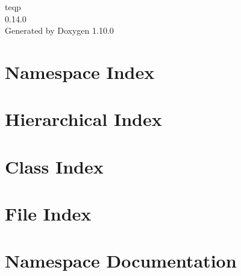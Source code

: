 \documentclass[twoside]{book}
\newcommand{\+}{\discretionary{\mbox{\scriptsize$\hookleftarrow$}}{}{}}
\newcommand{\clearemptydoublepage}{%
    \newpage{\pagestyle{empty}\cleardoublepage}%
  }
\begin{document}
  \raggedbottom
    \hypersetup{pageanchor=false,
                bookmarksnumbered=true,
                pdfencoding=unicode
               }
  \begin{titlepage}
  \vspace*{7cm}
  \begin{center}%
  {\Large teqp}\\
  [1ex]\large 0.\+14.\+0 \\
  \vspace*{1cm}
  {\large Generated by Doxygen 1.10.0}\\
  \end{center}
  \end{titlepage}
  \clearemptydoublepage
  \tableofcontents
  \clearemptydoublepage
  \hypersetup{pageanchor=true}
\chapter{Namespace Index}

\chapter{Hierarchical Index}

\chapter{Class Index}

\chapter{File Index}

\chapter{Namespace Documentation}

























\end{document}
